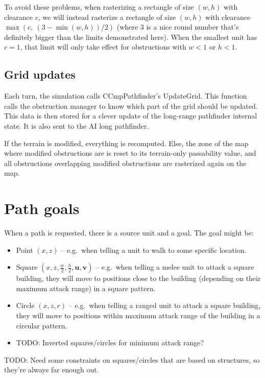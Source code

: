 \documentclass[a4paper,10pt]{article}
\begin{document}
To avoid these problems,
when rasterizing a rectangle of size $(w,h)$ with clearance $c$,
we will instead rasterize a rectangle of size $(w,h)$ with clearance $\max(c,\ (3-\min(w,h))/2)$
(where 3 is a nice round number that's definitely bigger than the limits demonstrated here).
When the smallest unit has $c=1$,
that limit will only take effect for obstructions with $w < 1$ or $h < 1$.

\subsection{Grid updates}

Each turn, the simulation calls CCmpPathfinder's UpdateGrid. This function calls the obstruction manager to know which part of the grid should be updated. This data is then stored for a clever update of the long-range pathfinder internal state. It is also sent to the AI long pathfinder.

If the terrain is modified, everything is recomputed. Else, the zone of the map where modified obstructions are is reset to its terrain-only passability value, and all obstructions overlapping modified obstructions are rasterized again on the map.

\section{Path goals}

When a path is requested, there is a source unit and a goal.
The goal might be:
\begin{itemize}
 \item Point $(x, z)$ --
 e.g.\ when telling a unit to walk to some specific location.
 \item Square $(x, z, \frac{w}{2}, \frac{h}{2}, \mathbf{u}, \mathbf{v})$ --
 e.g.\ when telling
 a melee unit to attack a square building, they will move to positions close to the building
 (depending on their maximum attack range) in a square pattern.
 \item Circle $(x, z, r)$ --
 e.g.\ when telling
 a ranged unit to attack a square building, they will move to positions within
 maximum attack range of the building in a circular pattern.
 \item TODO: Inverted squares/circles for minimum attack range?
\end{itemize}

TODO: Need some constraints on squares/circles that are based on structures,
so they're always far enough out.
\end{document}
